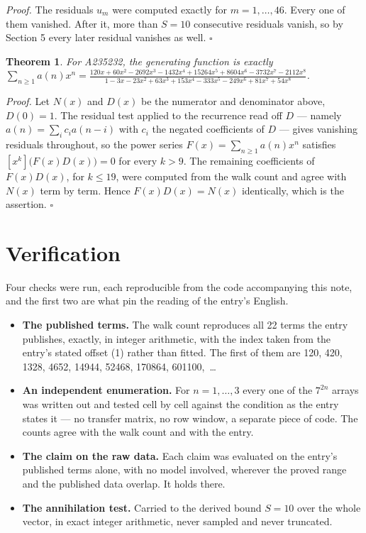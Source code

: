 \documentclass[11pt]{article}
\newtheorem{theorem}{Theorem}
\theoremstyle{definition}
\begin{document}
{\itshape Proof.} The residuals $u_m$ were computed exactly for $m = 1,\dots,46$. Every one of them vanished. After it, more than $S = 10$ consecutive residuals vanish, so by Section 5 every later residual vanishes as well. $\square$

\begin{theorem} For A235232, the generating function is exactly $\sum_{n\ge 1} a(n)x^n = \frac{120x + 60x^{2} - 2692x^{3} - 1432x^{4} + 15264x^{5} + 8604x^{6} - 3732x^{7} - 2112x^{8}}{1 - 3x - 23x^{2} + 63x^{3} + 153x^{4} - 333x^{5} - 249x^{6} + 81x^{7} + 54x^{8}}$.\end{theorem}

{\itshape Proof.} Let $N(x)$ and $D(x)$ be the numerator and denominator above, $D(0)=1$. The residual test applied to the recurrence read off $D$ --- namely $a(n) = \sum_i c_i a(n-i)$ with $c_i$ the negated coefficients of $D$ --- gives vanishing residuals throughout, so the power series $F(x)=\sum_{n\ge 1}a(n)x^n$ satisfies $[x^k]\bigl(F(x)D(x)\bigr) = 0$ for every $k > 9$. The remaining coefficients of $F(x)D(x)$, for $k \le 19$, were computed from the walk count and agree with $N(x)$ term by term. Hence $F(x)D(x) = N(x)$ identically, which is the assertion. $\square$

\section{Verification}

Four checks were run, each reproducible from the code accompanying this note, and the first two are what pin the reading of the entry's English.

\begin{itemize}

\item {\bfseries The published terms.} The walk count reproduces all 22 terms the entry publishes, exactly, in integer arithmetic, with the index taken from the entry's stated offset (1) rather than fitted. The first of them are 120, 420, 1328, 4652, 14944, 52468, 170864, 601100,~\dots

\item {\bfseries An independent enumeration.} For $n = 1,\dots,3$ every one of the $7^{2n}$ arrays was written out and tested cell by cell against the condition as the entry states it --- no transfer matrix, no row window, a separate piece of code. The counts agree with the walk count and with the entry.

\item {\bfseries The claim on the raw data.} Each claim was evaluated on the entry's published terms alone, with no model involved, wherever the proved range and the published data overlap. It holds there.

\item {\bfseries The annihilation test.} Carried to the derived bound $S = 10$ over the whole vector, in exact integer arithmetic, never sampled and never truncated.

\end{itemize}
\end{document}
